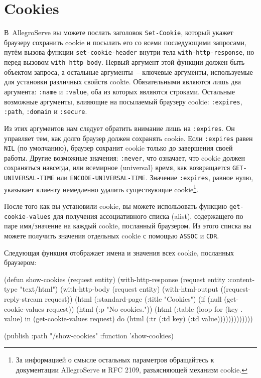 \section{Cookies}

В~AllegroServe вы можете послать заголовок \lstinline{Set-Cookie}, который укажет браузеру
сохранить cookie и посылать его со всеми последующими запросами, путём вызова функции
\lstinline{set-cookie-header} внутри тела \lstinline{with-http-response}, но перед вызовом
\lstinline{with-http-body}. Первый аргумент этой функции должен быть объектом запроса, а
остальные аргументы~-- ключевые аргументы, используемые для установки различных свойств
cookie. Обязательными являются лишь два аргумента: \lstinline{:name} и \lstinline{:value}, оба из
которых являются строками. Остальные возможные аргументы, влияющие на посылаемый браузеру
cookie: \lstinline{:expires}, \lstinline{:path}, \lstinline{:domain} и \lstinline{:secure}.

Из этих аргументов нам следует обратить внимание лишь на \lstinline{:expires}. Он управляет
тем, как долго браузер должен сохранять cookie. Если \lstinline{:expires} равен \lstinline{NIL}
(по умолчанию), браузер сохранит cookie только до завершения своей работы. Другие
возможные значения: \lstinline{:never}, что означает, что cookie должен сохраняться навсегда,
или всемирное (universal) время, как возвращается \lstinline{GET-UNIVERSAL-TIME} или
\lstinline{ENCODE-UNIVERSAL-TIME}. Значение \lstinline{:expires}, равное нулю, указывает клиенту
немедленно удалить существующие cookie\footnote{За информацией о смысле остальных
  параметров обращайтесь к документации AllegroServe и RFC 2109, разъясняющей механизм
  cookie.}.

После того как вы установили cookie, вы можете использовать функцию
\lstinline{get-cookie-values} для получения ассоциативного списка (alist), содержащего по паре
имя/значение на каждый cookie, посланный браузером. Из этого списка вы можете получить
значения отдельных cookie с помощью \lstinline{ASSOC} и \lstinline{CDR}.

Следующая функция отображает имена и значения всех cookie, посланных браузером:

\begin{myverb}
(defun show-cookies (request entity)
  (with-http-response (request entity :content-type "text/html")
    (with-http-body (request entity)
      (with-html-output ((request-reply-stream request))
        (html
          (:standard-page
           (:title "Cookies")
           (if (null (get-cookie-values request))
             (html (:p "No cookies."))
             (html 
               (:table
                 (loop for (key . value) in (get-cookie-values request)
                    do (html (:tr (:td key) (:td value)))))))))))))

(publish :path "/show-cookies" :function 'show-cookies)
\end{myverb}

